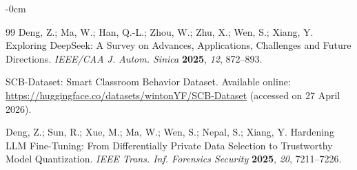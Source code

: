 \documentclass[symmetry,article,submit,pdftex,moreauthors]{Definitions/mdpi}
\begin{document}
\begin{adjustwidth}{-\extralength}{0cm}
\begin{thebibliography}{99}
Deng, Z.; Ma, W.; Han, Q.-L.; Zhou, W.; Zhu, X.; Wen, S.; Xiang, Y.
Exploring DeepSeek: A Survey on Advances, Applications, Challenges and Future Directions.
\textit{IEEE/CAA J. Autom. Sinica} \textbf{2025}, \textit{12}, 872--893.

SCB-Dataset: Smart Classroom Behavior Dataset.
Available online: \url{https://huggingface.co/datasets/wintonYF/SCB-Dataset} (accessed on 27 April 2026).

Deng, Z.; Sun, R.; Xue, M.; Ma, W.; Wen, S.; Nepal, S.; Xiang, Y.
Hardening LLM Fine-Tuning: From Differentially Private Data Selection to Trustworthy Model Quantization.
\textit{IEEE Trans. Inf. Forensics Security} \textbf{2025}, \textit{20}, 7211--7226.

\end{thebibliography}

\end{adjustwidth}
\end{document}
